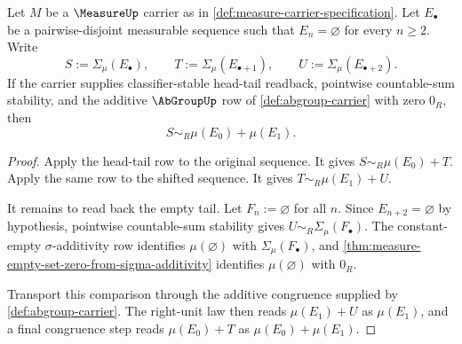 \begin{theorem}
\label{thm:measure-finite-support-countable-readback}
Let $M$ be a $\MeasureUp$ carrier as in \autoref{def:measure-carrier-specification}. Let $E_\bullet$ be a pairwise-disjoint measurable sequence such that $E_n=\varnothing$ for every $n\geq2$. Write
$$
S:=\Sigma_\mu(E_\bullet),\qquad
T:=\Sigma_\mu(E_{\bullet+1}),\qquad
U:=\Sigma_\mu(E_{\bullet+2}).
$$
If the carrier supplies classifier-stable head-tail readback, pointwise countable-sum stability, and the additive $\AbGroupUp$ row of \autoref{def:abgroup-carrier} with zero $0_R$, then
$$
S\sim_R\mu(E_0)+\mu(E_1).
$$
\end{theorem}
\begin{proof}
Apply the head-tail row to the original sequence. It gives $S\sim_R\mu(E_0)+T$. Apply the same row to the shifted sequence. It gives $T\sim_R\mu(E_1)+U$.

It remains to read back the empty tail. Let $F_n:=\varnothing$ for all $n$. Since $E_{n+2}=\varnothing$ by hypothesis, pointwise countable-sum stability gives $U\sim_R\Sigma_\mu(F_\bullet)$. The constant-empty $\sigma$-additivity row identifies $\mu(\varnothing)$ with $\Sigma_\mu(F_\bullet)$, and \autoref{thm:measure-empty-set-zero-from-sigma-additivity} identifies $\mu(\varnothing)$ with $0_R$.

Transport this comparison through the additive congruence supplied by \autoref{def:abgroup-carrier}. The right-unit law then reads $\mu(E_1)+U$ as $\mu(E_1)$, and a final congruence step reads $\mu(E_0)+T$ as $\mu(E_0)+\mu(E_1)$.
\end{proof}


